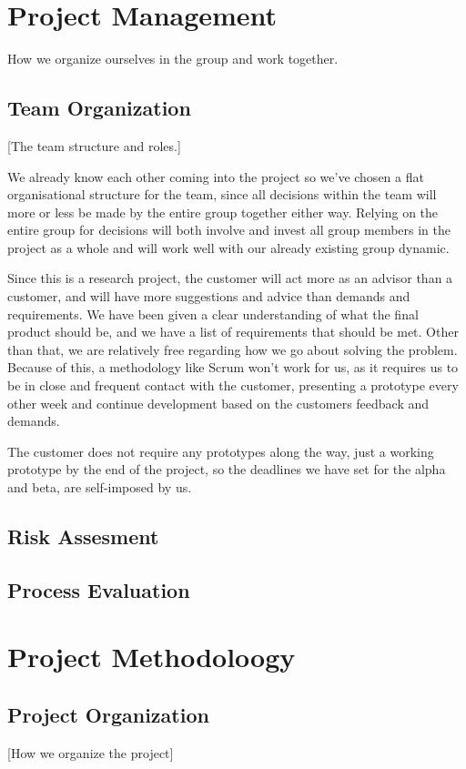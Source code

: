 \documentclass[12pt]{article}
\begin{document}
\section{Project Management}\label{management} How we organize ourselves in the group and work together. 
    \subsection{Team Organization}\label{team} [The team structure and roles.]
    
    We already know each other coming into the project so we’ve chosen a flat organisational structure for the team, since all decisions within the team will more or less be made by the entire group together either way. Relying on the entire group for decisions will both involve and invest all group members in the project as a whole and will work well with our already existing group dynamic.

Since this is a research project, the customer will act more as an advisor than a customer, and will have more suggestions and advice than demands and requirements. We have been given a clear understanding of what the final product should be, and we have a list of requirements that should be met. Other than that, we are relatively free regarding how we go about solving the problem. Because of this, a methodology like Scrum won't work for us, as it requires us to be in close and frequent contact with the customer, presenting a prototype every other week and continue development based on the customers feedback and demands.

The customer does not require any prototypes along the way, just a working prototype by the end of the project, so the deadlines we have set for the alpha and beta, are self-imposed by us.
    \subsection{Risk Assesment}\label{risk}
    \subsection{Process Evaluation}\label{processevaluation}
\section{Project Methodoloogy}\label{methodology} 
    \subsection{Project Organization}\label{projectorg} [How we organize the project]
\end{document}
